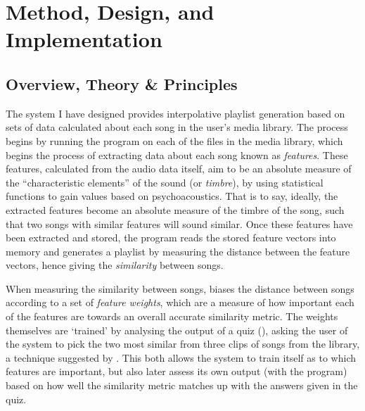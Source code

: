\chapter{Method, Design, and Implementation}
\section{Overview, Theory \& Principles}
The system I have designed provides interpolative playlist generation based on sets of data calculated about each song in the user's media library. The process begins by running the  program on each of the files in the media library, which begins the process of extracting data about each song known as \emph{features}. These features, calculated from the audio data itself, aim to be an absolute measure of the ``characteristic elements'' \citep{Fingerhut2004} of the sound (or \emph{timbre}), by using statistical functions to gain values based on psychoacoustics. That is to say, ideally, the extracted features become an absolute measure of the timbre of the song, such that two songs with similar features will sound similar. Once these features have been extracted and stored, the  program reads the stored feature vectors into memory and generates a playlist by measuring the distance between the feature vectors, hence giving the \emph{similarity} between songs.

When measuring the similarity between songs,  biases the distance between songs according to a set of \emph{feature weights}, which are a measure of how important each of the features are towards an overall accurate similarity metric. The weights themselves are `trained' by analysing the output of a quiz (), asking the user of the system to pick the two most similar from three clips of songs from the library, a technique suggested by \citet*{Novello2006}. This both allows the system to train itself as to which features are important, but also later assess its own output (with the  program) based on how well the similarity metric matches up with the answers given in the quiz.


